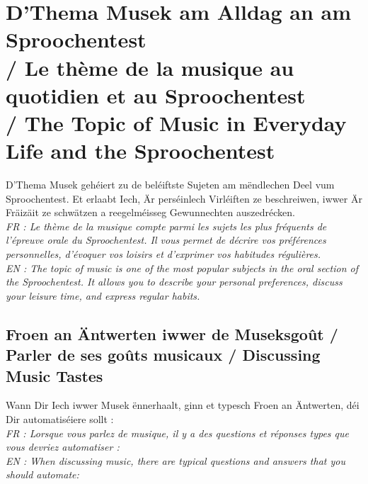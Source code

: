\vspace{1.5em}

\section[D'Thema Musek am Alldag an am Sproochentest / Topic: Music]{D'Thema Musek am Alldag an am Sproochentest \\/ Le thème de la musique au quotidien et au Sproochentest \\/ The Topic of Music in Everyday Life and the Sproochentest}

D'Thema Musek gehéiert zu de beléiftste Sujeten am mëndlechen Deel vum Sproochentest. Et erlaabt Iech, Är perséinlech Virléiften ze beschreiwen, iwwer Är Fräizäit ze schwätzen a reegelméisseg Gewunnechten auszedrécken. \\
\textit{FR : Le thème de la musique compte parmi les sujets les plus fréquents de l'épreuve orale du Sproochentest. Il vous permet de décrire vos préférences personnelles, d'évoquer vos loisirs et d'exprimer vos habitudes régulières.} \\
\textit{EN : The topic of music is one of the most popular subjects in the oral section of the Sproochentest. It allows you to describe your personal preferences, discuss your leisure time, and express regular habits.}

\subsection{Froen an Äntwerten iwwer de Museksgoût / Parler de ses goûts musicaux / Discussing Music Tastes}

Wann Dir Iech iwwer Musek ënnerhaalt, ginn et typesch Froen an Äntwerten, déi Dir automatiséiere sollt : \\
\textit{FR : Lorsque vous parlez de musique, il y a des questions et réponses types que vous devriez automatiser :} \\
\textit{EN : When discussing music, there are typical questions and answers that you should automate:}

